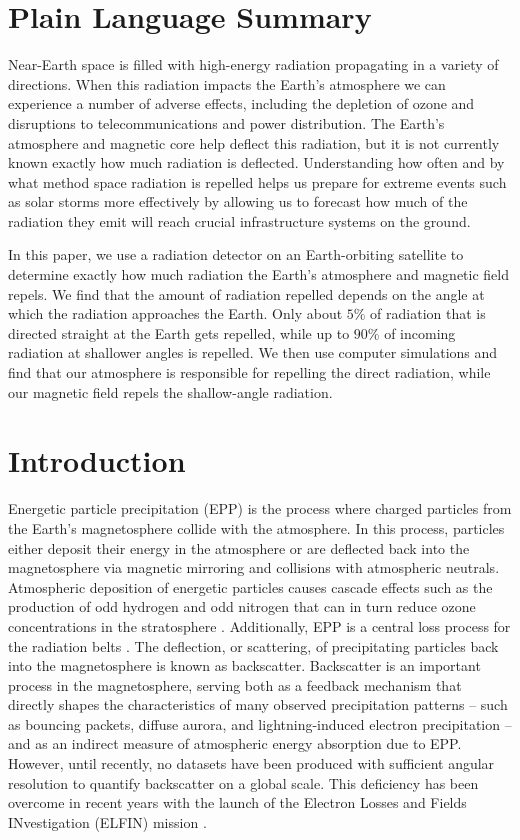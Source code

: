 \documentclass[draft]{agujournal2019}
\begin{document}
\section*{Plain Language Summary}
Near-Earth space is filled with high-energy radiation propagating in a variety of directions. When this radiation impacts the Earth's atmosphere we can experience a number of adverse effects, including the depletion of ozone and disruptions to telecommunications and power distribution. The Earth's atmosphere and magnetic core help deflect this radiation, but it is not currently known exactly how much radiation is deflected. Understanding how often and by what method space radiation is repelled helps us prepare for extreme events such as solar storms more effectively by allowing us to forecast how much of the radiation they emit will reach crucial infrastructure systems on the ground.

In this paper, we use a radiation detector on an Earth-orbiting satellite to determine exactly how much radiation the Earth's atmosphere and magnetic field repels. We find that the amount of radiation repelled depends on the angle at which the radiation approaches the Earth. Only about $5\%$ of radiation that is directed straight at the Earth gets repelled, while up to $90\%$ of incoming radiation at shallower angles is repelled. We then use computer simulations and find that our atmosphere is responsible for repelling the direct radiation, while our magnetic field repels the shallow-angle radiation.

\section{Introduction}
Energetic particle precipitation (EPP) is the process where charged particles from the Earth's magnetosphere collide with the atmosphere. In this process, particles either deposit their energy in the atmosphere or are deflected back into the magnetosphere via magnetic mirroring and collisions with atmospheric neutrals. Atmospheric deposition of energetic particles causes cascade effects such as the production of odd hydrogen and odd nitrogen that can in turn reduce ozone concentrations in the stratosphere \cite{randall2005, seppällä2007, sinnhuber2012, funke2014, koskinen-beltbook}. Additionally, EPP is a central loss process for the radiation belts \cite{ripoll2020, millan2007}. The deflection, or scattering, of precipitating particles back into the magnetosphere is known as backscatter. Backscatter is an important process in the magnetosphere, serving both as a feedback mechanism that directly shapes the characteristics of many observed precipitation patterns -- such as bouncing packets, diffuse aurora, and lightning-induced electron precipitation \cite{feinland2024, wetzel2024, khazanov2021, cotts2011, davidson1977} -- and as an indirect measure of atmospheric energy absorption due to EPP. However, until recently, no datasets have been produced with sufficient angular resolution to quantify backscatter on a global scale. This deficiency has been overcome in recent years with the launch of the Electron Losses and Fields INvestigation (ELFIN) mission \cite{angelopoulos2020}.
\end{document}
